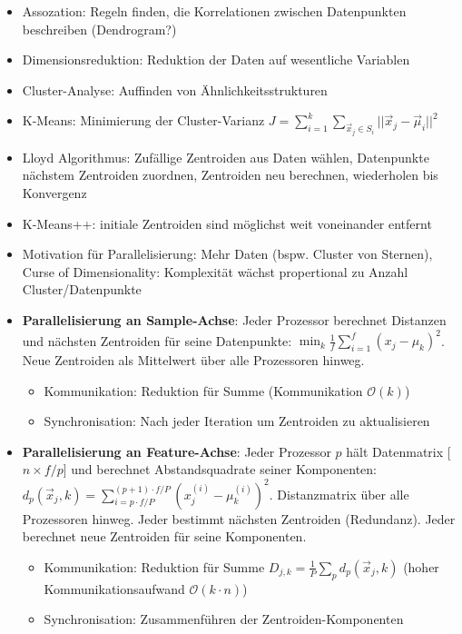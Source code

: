 \documentclass[11pt]{scrartcl}
\begin{document}
\begin{itemize}
    \item Assozation: Regeln finden, die Korrelationen zwischen Datenpunkten beschreiben (Dendrogram?)
    \item Dimensionsreduktion: Reduktion der Daten auf wesentliche Variablen
    \item Cluster-Analyse: Auffinden von Ähnlichkeitsstrukturen
    \item K-Means: Minimierung der Cluster-Varianz $J = \sum_{i=1}^k \sum_{\vec{x}_j \in S_i} || \vec{x}_j - \vec{\mu}_i ||^2 $
    \item Lloyd Algorithmus: Zufällige Zentroiden aus Daten wählen, Datenpunkte nächstem Zentroiden zuordnen, Zentroiden neu berechnen, wiederholen bis Konvergenz
    \item K-Means++: initiale Zentroiden sind möglichst weit voneinander entfernt
    \item Motivation für Parallelisierung: Mehr Daten (bspw. Cluster von Sternen), 
    Curse of Dimensionality: Komplexität wächst propertional zu Anzahl Cluster/Datenpunkte
    \item \textbf{Parallelisierung an Sample-Achse}: Jeder Prozessor berechnet Distanzen und nächsten
    Zentroiden für seine Datenpunkte: $ \min_k \frac{1}{f} \sum_{i = 1}^f (x_j - \mu_k)^2 $. 
    Neue Zentroiden als Mittelwert über alle Prozessoren hinweg.
    \begin{itemize}
        \item Kommunikation: Reduktion für Summe (Kommunikation $\mathcal{O}(k)$)
        \item Synchronisation: Nach jeder Iteration um Zentroiden zu aktualisieren
    \end{itemize}
    \item \textbf{Parallelisierung an Feature-Achse}: Jeder Prozessor $p$ hält Datenmatrix 
    [$ n \times f / p $] und berechnet Abstandsquadrate seiner Komponenten:
    $d_p(\vec{x}_j, k) = \sum_{i=p \cdot f / P}^{(p + 1) \cdot f / P} (x_j^{(i)} - \mu_k^{(i)})^2 $.
    Distanzmatrix über alle Prozessoren hinweg. Jeder bestimmt nächsten 
    Zentroiden (Redundanz). Jeder berechnet neue Zentroiden für seine Komponenten.
    \begin{itemize}
        \item Kommunikation: Reduktion für Summe $D_{j, k} = \frac{1}{P} \sum_p d_p(\vec{x}_j, k)$
        (hoher Kommunikationsaufwand $\mathcal{O}(k \cdot n)$)
        \item Synchronisation: Zusammenführen der Zentroiden-Komponenten

\end{itemize}
\end{itemize}
\end{document}
